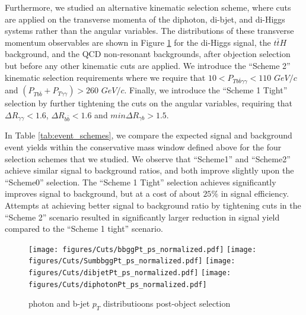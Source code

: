 \documentclass{cmspaper}
\begin{document}
Furthermore, we studied an alternative kinematic selection scheme, where cuts are applied
on the transverse momenta of the diphoton, di-bjet, and di-Higgs systems rather than the angular variables.
The distributions of these transverse momentum observables are shown in Figure \ref{fig:Ptcuts} for the 
di-Higgs signal, the  $t\bar{t}H$ background, and the QCD non-resonant backgrounds, after objection
selection but before any other kinematic cuts are applied. We introduce the ``Scheme 2'' 
kinematic selection requirements where we require that $10 < P_{Tb\bar{b}\gamma\gamma} < 110$ $GeV/c$ 
and $(P_{Tb\bar{b}}+P_{T\gamma\gamma})>260$ $GeV/c$. 
Finally, we introduce the ``Scheme 1 Tight'' selection by further tightening the 
cuts on the angular variables, requiring that $\Delta R_{\gamma\gamma} < 1.6$, 
$\Delta R_{b\bar{b}}<1.6$ and $min\Delta R_{\gamma b} > 1.5$. 

In Table \ref{tab:event_schemes}, we compare the expected signal and background event yields
within the conservative mass window defined above for the four selection schemes that we studied. 
We observe that ``Scheme1'' and ``Scheme2'' achieve similar signal to background ratios, and both
improve slightly upon the ``Scheme0'' selection. The ``Scheme 1 Tight'' selection achieves
significantly improves signal to background, but at a cost of about $25\%$ in signal efficiency.
Attempts at achieving better signal to background ratio by tightening cuts in the ``Scheme 2''
scenario resulted in significantly larger reduction in signal yield compared to the ``Scheme 1 tight''
scenario. 

\begin{figure}
\centering
\texttt{[image: figures/Cuts/bbggPt\_ps\_normalized.pdf]}	
\texttt{[image: figures/Cuts/SumbbggPt\_ps\_normalized.pdf]}	
\texttt{[image: figures/Cuts/dibjetPt\_ps\_normalized.pdf]}	
\texttt{[image: figures/Cuts/diphotonPt\_ps\_normalized.pdf]}	
\caption{photon and b-jet $p_{T}$ distributioons post-object selection}
\label{fig:Ptcuts}
\end{figure}
\end{document}

